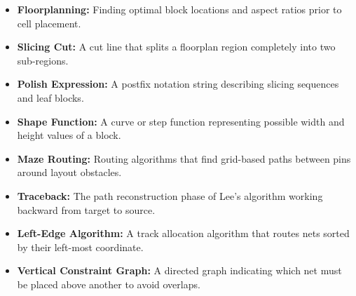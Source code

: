 \documentclass[12pt,a4paper]{article}
\begin{document}
\begin{tcolorbox}[defbox, title={\textbf{One-Line Definitions}}]
\begin{itemize}[leftmargin=*, itemsep=3pt, topsep=0pt]
  \item \textbf{Floorplanning:} Finding optimal block locations and aspect ratios prior to cell placement.
  \item \textbf{Slicing Cut:} A cut line that splits a floorplan region completely into two sub-regions.
  \item \textbf{Polish Expression:} A postfix notation string describing slicing sequences and leaf blocks.
  \item \textbf{Shape Function:} A curve or step function representing possible width and height values of a block.
  \item \textbf{Maze Routing:} Routing algorithms that find grid-based paths between pins around layout obstacles.
  \item \textbf{Traceback:} The path reconstruction phase of Lee's algorithm working backward from target to source.
  \item \textbf{Left-Edge Algorithm:} A track allocation algorithm that routes nets sorted by their left-most coordinate.
  \item \textbf{Vertical Constraint Graph:} A directed graph indicating which net must be placed above another to avoid overlaps.
\end{itemize}
\end{tcolorbox}

\vspace{6pt}
\end{document}
